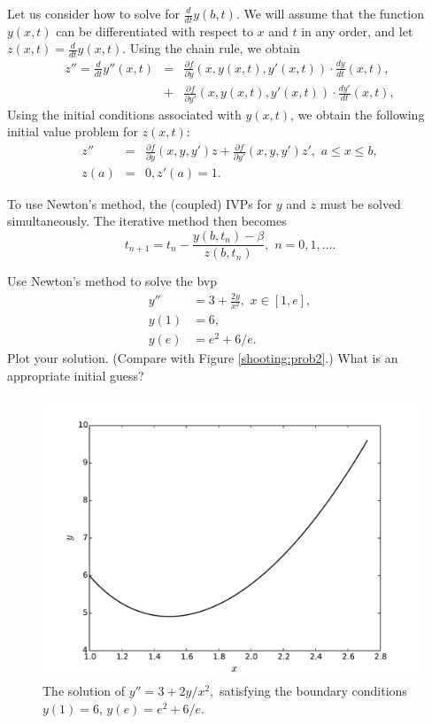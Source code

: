 Let us consider how to solve for $\frac{d}{dt} y(b,t)$. We will assume that the function $y(x,t)$ can be differentiated with respect to $x$ and $t$ in any order, and let  $z(x,t) = \frac{d}{dt} y(x,t).$ Using the chain rule, we obtain 
\begin{eqnarray*}
z'' = \frac{d}{dt} y''(x,t) &=& \frac{\partial f}{\partial y} (x,y(x,t),y'(x,t)) \cdot \frac{dy}{dt}(x,t) ,\\
&+& \frac{\partial f}{\partial y'} (x,y(x,t),y'(x,t)) \cdot \frac{dy'}{dt}(x,t),
\end{eqnarray*}
Using the initial conditions associated with $y(x,t)$, we obtain the following initial value problem for $z(x,t)$: 
\begin{eqnarray*}
z'' &=& \frac{\partial f}{\partial y} (x,y,y') z + \frac{\partial f}{\partial y'} (x,y,y') z'
,\,\,a \leq x \leq b, \\
 z(a) &=& 0, z'(a) = 1.
\end{eqnarray*}

To use Newton's method, the (coupled) IVPs for $y$ and $z$ must be solved simultaneously. The iterative method then becomes 
\[
t_{n+1} = t_n - \frac{ y(b,t_n) - \beta}{z(b,t_n)}, \,\, n = 0,1,\hdots
.\]


\begin{problem}
Use Newton's method to solve the bvp
\begin{equation*}
\begin{split}
y'' &= 3 + \frac{2y}{x^2}, \,\, x \in [1,e],\\
y(1) &= 6, \\
y(e) &= e^2 + 6/e.
\end{split}
\end{equation*}
Plot your solution. (Compare with Figure \eqref{shooting:prob2}.) What is an appropriate initial guess? 
\end{problem}


\begin{figure}[ht]
\centering
\includegraphics[width=\textwidth]{Fig2.pdf}
\caption{The solution of  $y'' = 3 + 2y/x^2,$ satisfying the boundary conditions $y(1) = 6$, $ y(e) =  e^2 + 6/e$.}
\label{shooting:prob2}
\end{figure}

